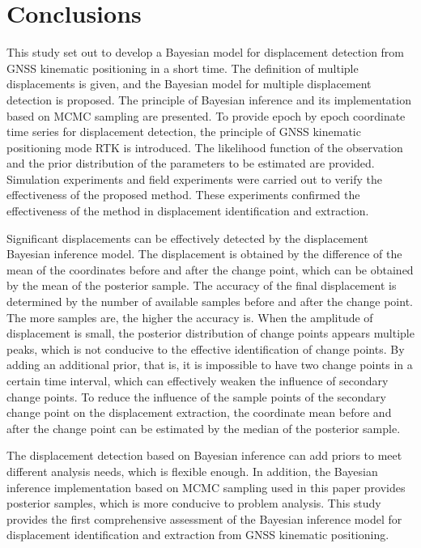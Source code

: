 \documentclass{svjour3}                     %
\begin{document}
\section{Conclusions}
\label{concl}
This study set out to develop a Bayesian model for displacement detection from GNSS kinematic positioning in a short time. 
The definition of multiple displacements is given, and the Bayesian model for multiple displacement detection is proposed.
The principle of Bayesian inference and its implementation based on MCMC sampling are presented.
To provide epoch by epoch coordinate time series for displacement detection, the principle of GNSS kinematic positioning mode RTK is introduced.
The likelihood function of the observation and the prior distribution of the parameters to be estimated are provided.
Simulation experiments and field experiments were carried out to verify the effectiveness of the proposed method. 
These experiments confirmed the effectiveness of the method in displacement identification and extraction.

Significant displacements can be effectively detected by the displacement Bayesian inference model.
The displacement is obtained by the difference of the mean of the coordinates before and after the change point, which can be obtained by the mean of the posterior sample.
The accuracy of the final displacement is determined by the number of available samples before and after the change point.
The more samples are, the higher the accuracy is.
When the amplitude of displacement is small, the posterior distribution of change points appears multiple peaks, which is not conducive to the effective identification of change points.
By adding an additional prior, that is, it is impossible to have two change points in a certain time interval, which can effectively weaken the influence of secondary change points.
To reduce the influence of the sample points of the secondary change point on the displacement extraction, the coordinate mean before and after the change point can be estimated by the median of the posterior sample.

The displacement detection based on Bayesian inference can add priors to meet different analysis needs, which is flexible enough.
In addition, the Bayesian inference implementation based on MCMC sampling used in this paper provides posterior samples, which is more conducive to problem analysis.
This study provides the first comprehensive assessment of the Bayesian inference model for displacement identification and extraction from GNSS kinematic positioning.
\end{document}
